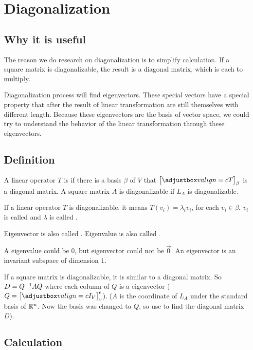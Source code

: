 \chapter{Diagonalization}

\section{Why it is useful}


The reason we do research on diagonalization is to simplify calculation. If a square matrix is diagonalizable, the result is a diagonal matrix, which is each to multiply.

Diagonalization process will find eigenvectors. These special vectors have a special property that after the result of linear transformation are still themselves with different length. Because these eigenvectors are the basis of vector space, we could try to understand the behavior of the linear transformation through these eigenvectors.

\section{Definition}


A linear operator $T$ is  if there is a basis $\beta$ of $V$ that $\coordinate{T}_\beta$ is a diagonal matrix. A square matrix $A$ is diagonalizable if $L_A$ is diagonalizable.

If a linear operator $T$ is diagonalizable, it means $T(v_i) = \lambda_i v_i$, for each $v_i \in \beta$. $v_i$ is called  and $\lambda$ is called . 

Eigenvector is also called . Eigenvalue is also called .

A eigenvalue could be $0$, but eigenvector could not be $\vec{0}$. An eigenvector is an invariant subspace of dimension $1$.


If a square matrix is diagonalizable, it is similar to a diagonal matrix. So $D = {Q}^{-1} A Q$ where each column of $Q$ is a eigenvector ($Q = \coordinate{I_V}_v^e$). ($A$ is the coordinate of $L_A$ under the standard basis of $\mathbb{R}^n$. Now the basis was changed to $Q$, so use  to find the diagonal matrix $D$).



\section{Calculation}

